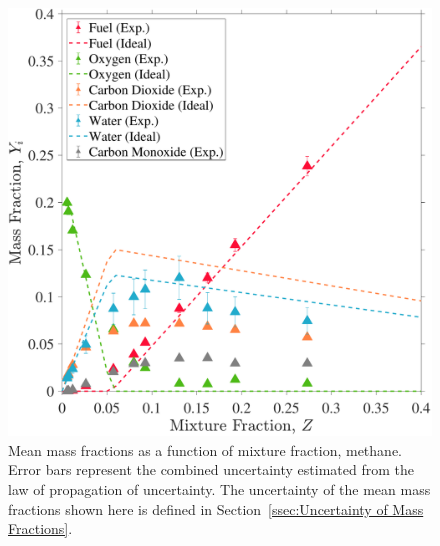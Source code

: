 \documentclass[12pt]{article}
\begin{document}
\begin{figure}[!]
	\centering
\includegraphics[width=\textwidth,keepaspectratio]{Adjusted_FuelMethane_Mixture_Fraction_Intermediate_Plot.pdf}
	\caption[Mean mass fractions as a function of mixture fraction, methane]{Mean mass fractions as a function of mixture fraction, methane. Error bars represent the combined uncertainty estimated from the law of propagation of uncertainty. The uncertainty of the mean mass fractions shown here is defined in Section~\ref{ssec:Uncertainty of Mass Fractions}.}
	\label{fig:Methane_Mix_Frac}
\end{figure}
\end{document}
